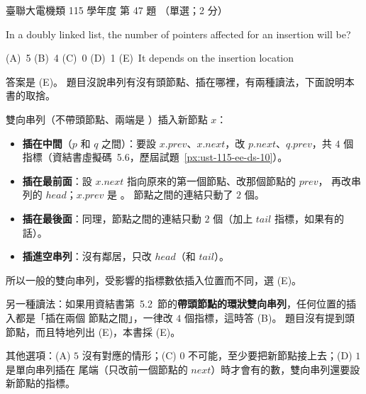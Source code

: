 \begin{pastexam}[label={px:ust-115-ee-ds-47}]{臺聯大電機類 115 學年度 第 47 題}
（單選；2 分）

In a doubly linked list, the number of pointers affected for an insertion will be?

(A)~5 \qquad (B)~4 \qquad (C)~0 \qquad (D)~1 \qquad (E)~It depends on the insertion location
\end{pastexam}

\begin{pastsoln}
答案是 (E)。 題目沒說串列有沒有頭節點、插在哪裡，有兩種讀法，下面說明本書的取捨。

雙向串列（不帶頭節點、兩端是 \NIL）插入新節點 $x$：
\begin{itemize}
\item \textbf{插在中間}（$p$ 和 $q$ 之間）：要設 $x.\mathit{prev}$、$x.\mathit{next}$，改
$p.\mathit{next}$、$q.\mathit{prev}$，共 $4$ 個指標（資結書虛擬碼~5.6，歷屆試題~\ref{px:ust-115-ee-ds-10}）。
\item \textbf{插在最前面}：設 $x.\mathit{next}$ 指向原來的第一個節點、改那個節點的 $\mathit{prev}$，
再改串列的 $\mathit{head}$；$x.\mathit{prev}$ 是 \NIL。 節點之間的連結只動了 $2$ 個。
\item \textbf{插在最後面}：同理，節點之間的連結只動 $2$ 個（加上 $\mathit{tail}$ 指標，如果有的話）。
\item \textbf{插進空串列}：沒有鄰居，只改 $\mathit{head}$（和 $\mathit{tail}$）。
\end{itemize}
所以一般的雙向串列，受影響的指標數依插入位置而不同，選 (E)。

另一種讀法：如果用資結書第~5.2~節的\textbf{帶頭節點的環狀雙向串列}，任何位置的插入都是「插在兩個
節點之間」，一律改 $4$ 個指標，這時答 (B)。 題目沒有提到頭節點，而且特地列出 (E)，本書採 (E)。

其他選項：(A) $5$ 沒有對應的情形；(C) $0$ 不可能，至少要把新節點接上去；(D) $1$ 是單向串列插在
尾端（只改前一個節點的 $\mathit{next}$）時才會有的數，雙向串列還要設新節點的指標。
\end{pastsoln}
